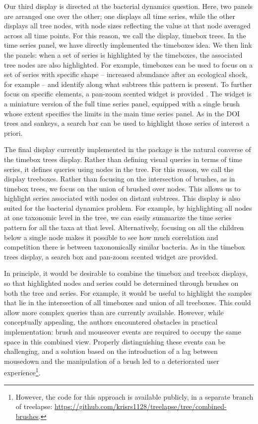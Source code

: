\documentclass[12pt]{article}
\begin{document}
Our third display is directed at the bacterial dynamics question. Here, two
panels are arranged one over the other; one displays all time series, while the
other displays all tree nodes, with node sizes reflecting the value at that node
averaged across all time points. For this reason, we call the display, timebox
trees. In the time series panel, we have directly implemented the timeboxes
idea. We then link the panels: when a set of series is highlighted by the
timeboxes, the associated tree nodes are also highlighted. For example,
timeboxes can be used to focus on a set of series with specific shape --
increased abundance after an ecological shock, for example -- and identify along
what subtrees this pattern is present. To further focus on specific elements, a
pan-zoom scented widget is provided \citep{willett2007scented}. The widget is a
miniature version of the full time series panel, equipped with a single brush
whose extent specifies the limits in the main time series panel. As in the DOI
trees and sankeys, a search bar can be used to highlight those series of
interest a priori.

The final display currently implemented in the package is the natural converse
of the timebox trees display. Rather than defining visual queries in terms of
time series, it defines queries using nodes in the tree. For this reason, we
call the display treeboxes. Rather than focusing on the intersection of brushes,
as in timebox trees, we focus on the union of brushed over nodes. This allows us
to highlight series associated with nodes on distant subtrees. This display is
also suited for the bacterial dynamics problem. For example, by highlighting all
nodes at one taxonomic level in the tree, we can easily summarize the time
series pattern for all the taxa at that level. Alternatively, focusing on all
the children below a single node makes it possible to see how much correlation
and competition there is between taxonomically similar bacteria. As in the
timebox trees display, a search box and pan-zoom scented widget are provided.

In principle, it would be desirable to combine the timebox and treebox displays,
so that highlighted nodes and series could be determined through brushes on both
the tree and series. For example, it would be useful to highlight the samples
that lie in the intersection of all timeboxes and union of all treeboxes. This
could allow more complex queries than are currently available. However, while
conceptually appealing, the authors encountered obstacles in practical
implementation: brush and mouseover events are required to occupy the same space
in this combined view. Properly distinguishing these events can be challenging,
and a solution based on the introduction of a lag between mousedown and the
manipulation of a brush led to a deteriorated user experience\footnote{However,
  the code for this approach is available publicly, in a separate branch of
  treelapse:
  \url{https://github.com/krisrs1128/treelapse/tree/combined-brushes}.}.
\end{document}
